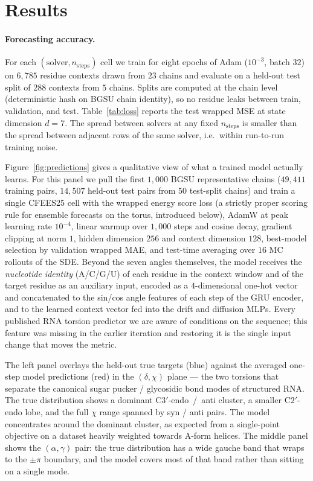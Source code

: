 \documentclass[11pt,a4paper]{article}
\begin{document}
\section{Results}

\paragraph{Forecasting accuracy.}
For each $(\text{solver}, n_{\mathrm{steps}})$ cell we train for
eight epochs of Adam ($10^{-3}$, batch $32$) on $6{,}785$ residue
contexts drawn from $23$ chains and evaluate on a held-out test
split of $288$ contexts from $5$ chains. Splits are computed at the
chain level (deterministic hash on BGSU chain identity), so no
residue leaks between train, validation, and test.
Table~\ref{tab:loss} reports the test wrapped MSE at state dimension
$d = 7$. The spread between solvers at any fixed $n_{\mathrm{steps}}$
is smaller than the spread between adjacent rows of the same solver,
i.e.\ within run-to-run training noise.

Figure~\ref{fig:predictions} gives a qualitative view of what a
trained model actually learns. For this panel we pull the first
$1{,}000$ BGSU representative chains ($49{,}411$ training pairs,
$14{,}507$ held-out test pairs from $50$ test-split chains) and
train a single CFEES25 cell with the wrapped energy score loss
(a strictly proper scoring rule for ensemble forecasts on the
torus, introduced below), AdamW at peak learning rate $10^{-4}$,
linear warmup over $1{,}000$ steps and cosine decay, gradient
clipping at norm $1$, hidden dimension $256$ and context dimension
$128$, best-model selection by validation wrapped MAE, and
test-time averaging over $16$ MC rollouts of the SDE. Beyond the seven angles themselves, the model
receives the \emph{nucleotide identity} (A/C/G/U) of each residue
in the context window and of the target residue as an auxiliary
input, encoded as a $4$-dimensional one-hot vector and concatenated
to the sin/cos angle features of each step of the GRU encoder, and
to the learned context vector fed into the drift and diffusion
MLPs. Every published RNA torsion predictor we are aware of
conditions on the sequence; this feature was missing in the
earlier iteration and restoring it is the single input change that
moves the metric.

The left panel overlays the held-out true targets (blue) against
the averaged one-step model predictions (red) in the
$(\delta, \chi)$ plane --- the two torsions that separate the
canonical sugar pucker / glycosidic bond modes of structured RNA.
The true distribution shows a dominant C$3'$-endo~/~anti cluster,
a smaller C$2'$-endo lobe, and the full $\chi$ range spanned by
syn / anti pairs. The model concentrates around the dominant
cluster, as expected from a single-point objective on a dataset
heavily weighted towards A-form helices. The middle panel shows
the $(\alpha, \gamma)$ pair: the true distribution has a wide
gauche band that wraps to the $\pm\pi$ boundary, and the model
covers most of that band rather than sitting on a single mode.
\end{document}
